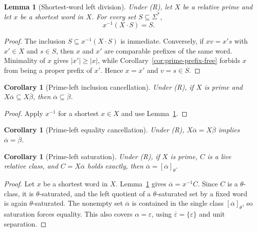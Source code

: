 \documentclass[11pt,a4paper]{article}
\newtheorem{lemma}[theorem]{Lemma}
\newtheorem{corollary}[theorem]{Corollary}
\newcommand{\eps}{\varepsilon}
\begin{document}
\begin{lemma}[Shortest-word left division]
\label{lem:shortest-left-division}
Under \textup{(R)}, let $X$ be a relative prime and let $x$ be a shortest word in $X$.  For every set $S\subseteq\Sigma^*$,
\[
  x^{-1}(X\cdot S)=S.
\]
\end{lemma}

\begin{proof}
The inclusion $S\subseteq x^{-1}(X\cdot S)$ is immediate.  Conversely, if $xv=x's$ with $x'\in X$ and $s\in S$, then $x$ and $x'$ are comparable prefixes of the same word.  Minimality of $x$ gives $|x'|\ge|x|$, while Corollary~\ref{cor:prime-prefix-free} forbids $x$ from being a proper prefix of $x'$.  Hence $x=x'$ and $v=s\in S$.
\end{proof}

\begin{corollary}[Prime-left inclusion cancellation]
\label{lem:prime-left-cancellation}
Under \textup{(R)}, if $X$ is prime and $X\overline\alpha\subseteq X\overline\beta$, then $\overline\alpha\subseteq\overline\beta$.
\end{corollary}

\begin{proof}
Apply $x^{-1}$ for a shortest $x\in X$ and use Lemma~\ref{lem:shortest-left-division}.
\end{proof}

\begin{corollary}[Prime-left equality cancellation]
\label{cor:prime-left-equality}
Under \textup{(R)}, $X\overline\alpha=X\overline\beta$ implies $\overline\alpha=\overline\beta$.
\end{corollary}

\begin{corollary}[Prime-left saturation]
\label{lem:prime-left-saturation}
Under \textup{(R)}, if $X$ is prime, $C$ is a live relative class, and $C=X\overline\alpha$ holds exactly, then $\overline\alpha=[\overline\alpha]_\theta$.
\end{corollary}

\begin{proof}
Let $x$ be a shortest word in $X$.  Lemma~\ref{lem:shortest-left-division} gives $\overline\alpha=x^{-1}C$.  Since $C$ is a $\theta$-class, it is $\theta$-saturated, and the left quotient of a $\theta$-saturated set by a fixed word is again $\theta$-saturated.  The nonempty set $\overline\alpha$ is contained in the single class $[\overline\alpha]_\theta$, so saturation forces equality.  This also covers $\alpha=\eps$, using $\overline\eps=\{\eps\}$ and unit separation.
\end{proof}
\end{document}
